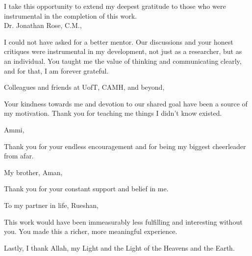 \noindent I take this opportunity to extend my deepest gratitude to those who were instrumental in the completion of this work.\\

\noindent Dr. Jonathan Rose, C.M.,\vspace{-5pt}
\begin{addmargin}[1em]{2em}
	I could not have asked for a better mentor. Our discussions and your honest critiques were instrumental in my development, not just as a researcher, but as an individual. You taught me the value of thinking and communicating clearly, and for that, I am forever grateful.\\
\end{addmargin}

\noindent Colleagues and friends at UofT, CAMH, and beyond,\vspace{-5pt}
\begin{addmargin}[1em]{2em}
	\indent Your kindness towards me and devotion to our shared goal have been a source of my motivation. Thank you for teaching me things I didn't know existed.\\
\end{addmargin}

\noindent Ammi,\vspace{-5pt}
\begin{addmargin}[1em]{2em}
	Thank you for your endless encouragement and for being my biggest cheerleader from afar.\\
\end{addmargin}

\noindent My brother, Aman,\vspace{-5pt}
\begin{addmargin}[1em]{2em}
	Thank you for your constant support and belief in me.\\
\end{addmargin}


\noindent To my partner in life, Rueshan,\vspace{-5pt}
\begin{addmargin}[1em]{2em}
	\indent This work would have been immeasurably less fulfilling and interesting without you. You made this a richer, more meaningful experience.\\
\end{addmargin}

\noindent Lastly, I thank Allah, my Light and the Light of the Heavens and the Earth.